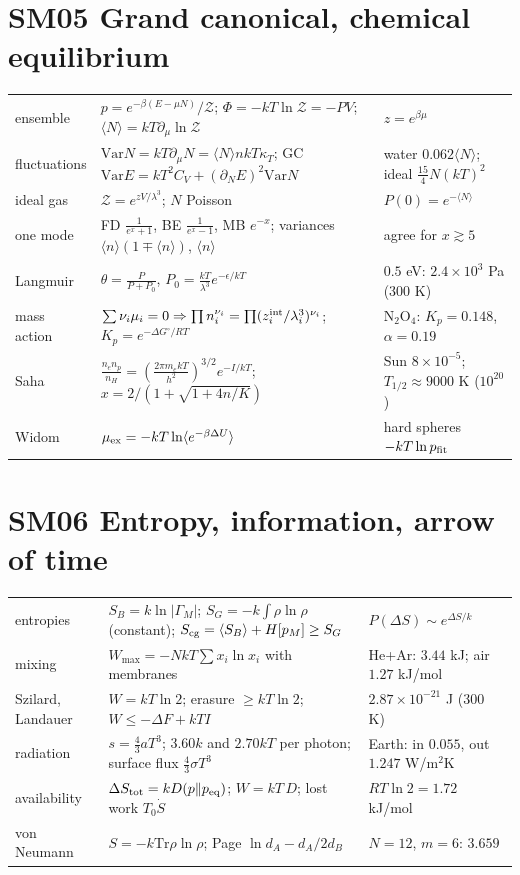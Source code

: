 \documentclass[9pt]{article}
\begin{document}
\section*{SM05 Grand canonical, chemical equilibrium}
\begin{tabular}{@{}p{2.9cm}p{8.9cm}p{5.6cm}@{}}
\toprule
ensemble & $p=e^{-\beta(E-\mu N)}/\mathcal Z$; $\Phi=-kT\ln\mathcal Z=-PV$; $\langle N\rangle=kT\partial_\mu\ln\mathcal Z$ & $z=e^{\beta\mu}$\\
fluctuations & $\mathrm{Var}N=kT\partial_\mu N=\langle N\rangle nkT\kappa_T$; GC $\mathrm{Var}E=kT^2C_V+(\partial_NE)^2\mathrm{Var}N$ & water $0.062\langle N\rangle$; ideal $\tfrac{15}4N(kT)^2$\\
ideal gas & $\mathcal Z=e^{zV/\lambda^3}$; $N$ Poisson & $P(0)=e^{-\langle N\rangle}$\\
one mode & FD $\tfrac1{e^x+1}$, BE $\tfrac1{e^x-1}$, MB $e^{-x}$; variances $\langle n\rangle(1\mp\langle n\rangle)$, $\langle n\rangle$ & agree for $x\gtrsim5$\\
Langmuir & $\theta=\tfrac P{P+P_0}$, $P_0=\tfrac{kT}{\lambda^3}e^{-\epsilon/kT}$ & $0.5$ eV: $2.4\times10^3$ Pa (300 K)\\
mass action & $\sum\nu_i\mu_i=0\Rightarrow\prod n_i^{\nu_i}=\prod(z_i^{\rm int}/\lambda_i^3)^{\nu_i}$; $K_p=e^{-\Delta G^\circ/RT}$ & N$_2$O$_4$: $K_p=0.148$, $\alpha=0.19$\\
Saha & $\tfrac{n_en_p}{n_H}=(\tfrac{2\pi m_ekT}{h^2})^{3/2}e^{-I/kT}$; $x=2/(1+\sqrt{1+4n/K})$ & Sun $8\times10^{-5}$; $T_{1/2}\approx9000$ K ($10^{20}$)\\
Widom & $\mu_{\rm ex}=-kT\ln\langle e^{-\beta\Delta U}\rangle$ & hard spheres $-kT\ln p_{\rm fit}$\\
\bottomrule
\end{tabular}

\section*{SM06 Entropy, information, arrow of time}
\begin{tabular}{@{}p{2.9cm}p{8.9cm}p{5.6cm}@{}}
\toprule
entropies & $S_B=k\ln|\Gamma_M|$; $S_G=-k\!\int\!\rho\ln\rho$ (constant); $S_{\rm cg}=\langle S_B\rangle+H[p_M]\ge S_G$ & $P(\Delta S)\sim e^{\Delta S/k}$\\
mixing & $W_{\max}=-NkT\sum x_i\ln x_i$ with membranes & He+Ar: $3.44$ kJ; air $1.27$ kJ/mol\\
Szilard, Landauer & $W=kT\ln2$; erasure $\ge kT\ln2$; $W\le-\Delta F+kTI$ & $2.87\times10^{-21}$ J (300 K)\\
radiation & $s=\tfrac43aT^3$; $3.60k$ and $2.70kT$ per photon; surface flux $\tfrac43\sigma T^3$ & Earth: in $0.055$, out $1.247$ W/m$^2$K\\
availability & $\Delta S_{\rm tot}=kD(p\|p_{\rm eq})$; $W=kT\,D$; lost work $T_0\dot S$ & $RT\ln2=1.72$ kJ/mol\\
von Neumann & $S=-k\mathrm{Tr}\rho\ln\rho$; Page $\ln d_A-d_A/2d_B$ & $N=12$, $m=6$: $3.659$\\
\bottomrule
\end{tabular}
\end{document}

